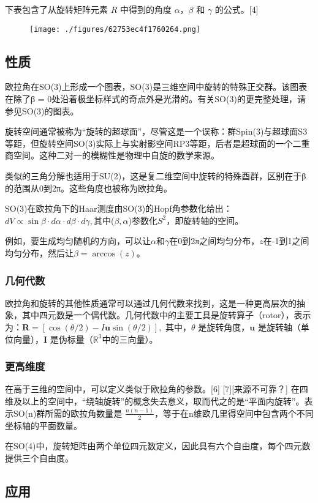 下表包含了从旋转矩阵元素 \( R \) 中得到的角度 \(\alpha\)，\(\beta\) 和 \(\gamma\) 的公式。[4]
\begin{figure}[ht]
\centering
\texttt{[image: ./figures/62753ec4f1760264.png]}
\caption{} \label{fig_OLJ_12}
\end{figure}
\subsection{性质}
欧拉角在SO(3)上形成一个图表，SO(3)是三维空间中旋转的特殊正交群。该图表在除了β = 0处沿着极坐标样式的奇点外是光滑的。有关SO(3)的更完整处理，请参见SO(3)的图表。

旋转空间通常被称为“旋转的超球面”，尽管这是一个误称：群Spin(3)与超球面S3等距，但旋转空间SO(3)实际上与实射影空间RP3等距，后者是超球面的一个二重商空间。这种二对一的模糊性是物理中自旋的数学来源。

类似的三角分解也适用于SU(2)，这是复二维空间中旋转的特殊酉群，区别在于β的范围从0到2π。这些角度也被称为欧拉角。

SO(3)在欧拉角下的Haar测度由SO(3)的Hopf角参数化给出：\(dV \propto \sin \beta \cdot d\alpha \cdot d\beta \cdot d\gamma,\)其中(\(\beta, \alpha\))参数化\(S^2\)，即旋转轴的空间。

例如，要生成均匀随机的方向，可以让\(\alpha\)和\(\gamma\)在0到2π之间均匀分布，\(z\)在-1到1之间均匀分布，然后让\(\beta = \arccos(z)\)。
\subsubsection{几何代数}
欧拉角和旋转的其他性质通常可以通过几何代数来找到，这是一种更高层次的抽象，其中四元数是一个偶代数。几何代数中的主要工具是旋转算子（rotor），表示为：\(\mathbf{R} = [\cos(\theta / 2) - I\mathbf{u}\sin(\theta / 2)],\)
其中，\(\theta\) 是旋转角度，\(\mathbf{u}\) 是旋转轴（单位向量），\(\mathbf{I}\) 是伪标量（\(\mathbb{R}^3\)中的三向量）。
\subsubsection{更高维度}
在高于三维的空间中，可以定义类似于欧拉角的参数。[6] [7][来源不可靠？] 在四维及以上的空间中，“绕轴旋转”的概念失去意义，取而代之的是“平面内旋转”。表示SO(n)群所需的欧拉角数量是 \( \frac{n(n - 1)}{2} \)，等于在n维欧几里得空间中包含两个不同坐标轴的平面数量。

在SO(4)中，旋转矩阵由两个单位四元数定义，因此具有六个自由度，每个四元数提供三个自由度。

\subsection{应用}
